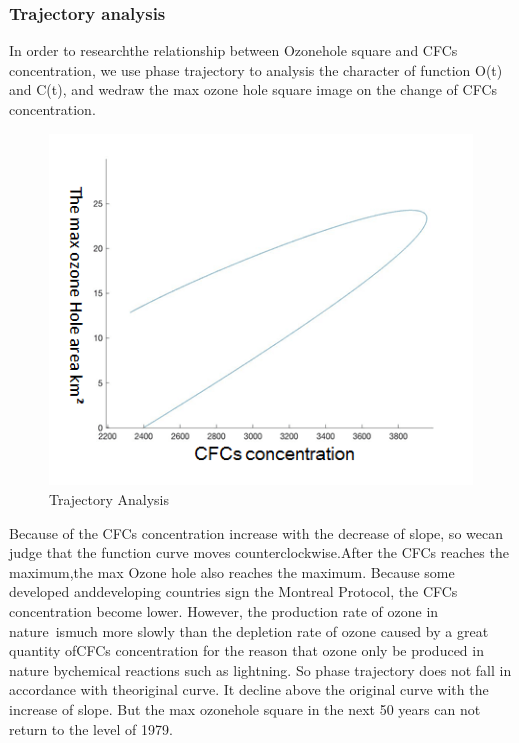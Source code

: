 \documentclass[12pt]{article}
\begin{document}
\subsubsection{Trajectory analysis}
In order to researchthe relationship between Ozonehole square and CFCs concentration, we use phase trajectory to analysis the character of function O(t) and C(t), and wedraw the max ozone hole square image on the change of CFCs concentration.
\begin{center}
\begin{figure}[htpb]
\centering
\includegraphics[scale=0.8]{tl}
\caption{Trajectory Analysis}\label{fig:xgx}
\end{figure}
\end{center}
Because of the CFCs concentration increase with the decrease of slope, so wecan judge that the function curve moves counterclockwise.After the CFCs reaches the maximum,the max Ozone hole also reaches the maximum. Because some developed anddeveloping countries sign the Montreal Protocol, the CFCs concentration become lower. However, the production rate of ozone in nature ismuch more slowly than the depletion rate of ozone caused by a great quantity ofCFCs concentration for the reason that ozone only be produced in nature bychemical reactions such as lightning. So phase trajectory does not fall in accordance with theoriginal curve. It decline above the original curve with the increase of slope. But the max ozonehole square in the next 50 years can not return to the level of 1979.
\end{document}
